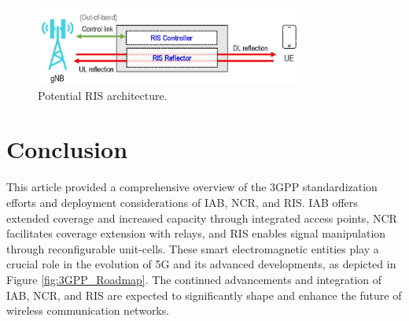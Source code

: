 \documentclass[lettersize,journal]{IEEEtran}
\begin{document}
\begin{figure}
\centering
\includegraphics[width=3.5in]{Figs/RIS.jpg}
\caption{Potential RIS architecture. }
\label{fig:RIS}
\end{figure}

\section{Conclusion}

This article provided a comprehensive overview of the 3GPP standardization efforts and deployment considerations of IAB, NCR, and RIS. IAB offers extended coverage and increased capacity through integrated access points, NCR facilitates coverage extension with relays, and RIS enables signal manipulation through reconfigurable unit-cells. These smart electromagnetic entities play a crucial role in the evolution of 5G and its advanced developments, as depicted in Figure \ref{fig:3GPP_Roadmap}. The continued advancements and integration of IAB, NCR, and RIS are expected to significantly shape and enhance the future of wireless communication networks.
\end{document}
